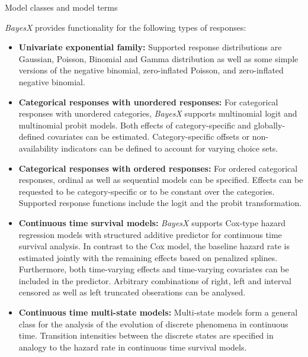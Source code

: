 \begin{stanza}{Model classes and model terms}

{\em BayesX} provides functionality for the following types of
responses:

\begin{itemize}
\item{\bf\sffamily Univariate exponential family:} Supported response distributions are Gaussian, Poisson, Binomial and Gamma distribution as well as some simple versions of the
    negative binomial, zero-inflated Poisson, and zero-inflated negative binomial.



\item{\bf\sffamily Categorical responses with unordered responses:} For categorical responses with unordered categories,
    {\em BayesX} supports multinomial logit and multinomial probit models. Both effects of category-specific and
    globally-defined covariates can be estimated. Category-specific offsets or non-availability indicators can be defined
    to account for varying choice sets.

\item{\bf\sffamily Categorical responses with ordered responses:} For ordered categorical responses, ordinal as well as
    sequential models can be specified. Effects can be requested to be category-specific or to be constant over the
    categories. Supported response functions include the logit and the probit transformation.

\item{\bf\sffamily Continuous time survival models:} {\em BayesX} supports Cox-type hazard regression models with
    structured additive predictor for continuous time survival analysis. In contrast to the Cox model, the baseline hazard
    rate is estimated jointly with the remaining effects based on penalized splines. Furthermore, both time-varying effects
    and time-varying covariates can be included in the predictor. Arbitrary combinations of right, left and interval
    censored as well as left truncated obserations can be analysed.

\item{\bf\sffamily Continuous time multi-state models:} Multi-state models form a general class for the analysis of the
    evolution of discrete phenomena in continuous time. Transition intensities between the discrete states are specified in
    analogy to the hazard rate in continuous time survival models.
\end{itemize}


\end{stanza}
